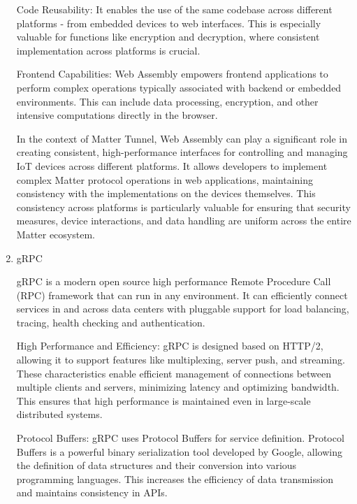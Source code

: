 \documentclass[conference]{IEEEtran}
\begin{document}
\begin{enumerate}[itemsep=2ex, parsep=1ex]
	      Code Reusability: It enables the use of the same codebase across different
	      platforms - from embedded devices to web interfaces. This is especially valuable
	      for functions like encryption and decryption, where consistent
	      implementation across platforms is crucial.
	      	      	      
	      Frontend Capabilities: Web Assembly empowers frontend applications to perform
	      complex operations typically associated with backend or embedded environments.
	      This can include data processing, encryption, and other intensive
	      computations directly in the browser.
	      	      	      
	      In the context of Matter Tunnel, Web Assembly can play a significant role in
	      creating consistent, high-performance interfaces for controlling and
	      managing IoT devices across different platforms. It allows developers to implement
	      complex Matter protocol operations in web applications, maintaining
	      consistency with the implementations on the devices themselves. This consistency
	      across platforms is particularly valuable for ensuring that security measures,
	      device interactions, and data handling are uniform across the entire Matter
	      ecosystem.
	      	      	      
	\item gRPC
	      	      	      
	      gRPC is a modern open source high performance Remote Procedure Call (RPC)
	      framework that can run in any environment. It can efficiently connect services
	      in and across data centers with pluggable support for load balancing,
	      tracing, health checking and authentication.
	      	      	      
	      High Performance and Efficiency: gRPC is designed based on HTTP/2, allowing
	      it to support features like multiplexing, server push, and streaming.
	      These characteristics enable efficient management of connections between
	      multiple clients and servers, minimizing latency and optimizing bandwidth.
	      This ensures that high performance is maintained even in large-scale
	      distributed systems.
	      	      	      
	      Protocol Buffers: gRPC uses Protocol Buffers for service definition.
	      Protocol Buffers is a powerful binary serialization tool developed by
	      Google, allowing the definition of data structures and their conversion into
	      various programming languages. This increases the efficiency of data
	      transmission and maintains consistency in APIs.
	      	      	      

\end{enumerate}
\end{document}
